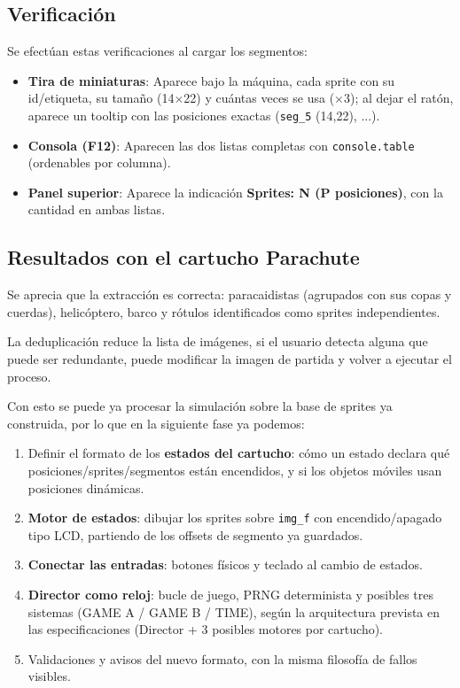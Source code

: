 \subsection{Verificación}
Se efectúan estas verificaciones al cargar los segmentos:
\begin{itemize}
	\item \textbf{Tira de miniaturas}: Aparece bajo la máquina, cada sprite con su id/etiqueta, su tamaño (14$\times$22) y cuántas veces se usa ($\times$3); al dejar el ratón, aparece un tooltip con las posiciones exactas (\texttt{seg\_5} (14,22), ...).
	\item \textbf{Consola (F12)}: Aparecen las dos listas completas con \texttt{console.table} (ordenables por columna).
	\item \textbf{Panel superior}: Aparece la indicación \textbf{Sprites: N (P posiciones)}, con la cantidad en ambas listas.
\end{itemize}

\subsection{Resultados con el cartucho Parachute}

Se aprecia que la extracción es correcta: paracaidistas (agrupados con sus copas y cuerdas), helicóptero, barco y rótulos identificados como sprites independientes.

La deduplicación reduce la lista de imágenes, si el usuario detecta alguna que puede ser redundante, puede modificar la imagen de partida y volver a ejecutar el proceso.

Con esto se puede ya procesar la simulación sobre la base de sprites ya construida, por lo que en la siguiente fase ya podemos:

\begin{enumerate}
	\item Definir el formato de los \textbf{estados del cartucho}: cómo un estado declara qué posiciones/sprites/segmentos están encendidos, y si los objetos móviles usan posiciones dinámicas.
	\item \textbf{Motor de estados}: dibujar los sprites sobre \texttt{img\_f} con encendido/apagado tipo LCD, partiendo de los offsets de segmento ya guardados.
	\item \textbf{Conectar las entradas}: botones físicos y teclado al cambio de estados.
	\item \textbf{Director como reloj}: bucle de juego, PRNG determinista y posibles tres sistemas (GAME A / GAME B / TIME), según la arquitectura prevista en las especificaciones (Director + 3 posibles motores por cartucho).
	\item Validaciones y avisos del nuevo formato, con la misma filosofía de fallos visibles.
\end{enumerate}

\clearpage
